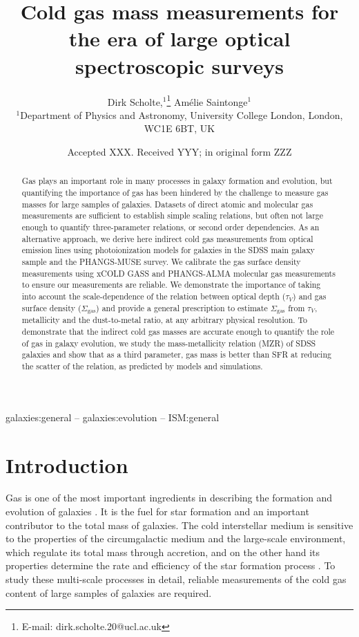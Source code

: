 \documentclass[fleqn,usenatbib]{mnras}
\title[Cold gas masses for spectroscopic surveys]{Cold gas mass measurements for the era of large optical spectroscopic surveys}
\author[D. Scholte et al.]{
Dirk Scholte,$^{1}$\thanks{E-mail: dirk.scholte.20@ucl.ac.uk}
Am\'elie Saintonge$^{1}$
\\
$^{1}$Department of Physics and Astronomy, University College London, London, WC1E 6BT, UK
}
\date{Accepted XXX. Received YYY; in original form ZZZ}
\begin{document}
\label{firstpage}
\pagerange{\pageref{firstpage}--\pageref{lastpage}}
\maketitle

\begin{abstract}
Gas plays an important role in many processes in galaxy formation and evolution, but quantifying the importance of gas has been hindered by the challenge to measure gas masses for large samples of galaxies. Datasets of direct atomic and molecular gas measurements are sufficient to establish simple scaling relations, but often not large enough to quantify three-parameter relations, or second order dependencies.  As an alternative approach, we derive here indirect cold gas measurements from optical emission lines using photoionization models for galaxies in the SDSS main galaxy sample and the PHANGS-MUSE survey. We calibrate the gas surface density measurements using xCOLD GASS and PHANGS-ALMA molecular gas measurements to ensure our measurements are reliable. We demonstrate the importance of taking into account the scale-dependence of the relation between optical depth ($\tau_V$) and gas surface density ($\Sigma_{\textrm{gas}}$) and provide a general prescription to estimate $\Sigma_{\textrm{gas}}$ from $\tau_V$, metallicity and the dust-to-metal ratio, at any arbitrary physical resolution. To demonstrate that the indirect cold gas masses are accurate enough to quantify the role of gas in galaxy evolution, we study the mass-metallicity relation (MZR) of SDSS galaxies and show that as a third parameter, gas mass is better than SFR at reducing the scatter of the relation, as predicted by models and simulations. 
\end{abstract}

\begin{keywords}
galaxies:general -- galaxies:evolution -- ISM:general
\end{keywords}



\section{Introduction}
Gas is one of the most important ingredients in describing the formation and evolution of galaxies \citep{tinsley1980}. It is the fuel for star formation and an important contributor to the total mass of galaxies. The cold interstellar medium is sensitive to the properties of the circumgalactic medium and the large-scale environment, which regulate its total mass through accretion, and on the other hand its properties determine the rate and efficiency of the star formation process \citep[e.g.][]{saintonge22}. To study these multi-scale processes in detail, reliable measurements of the cold gas content of large samples of galaxies are required.
\end{document}
